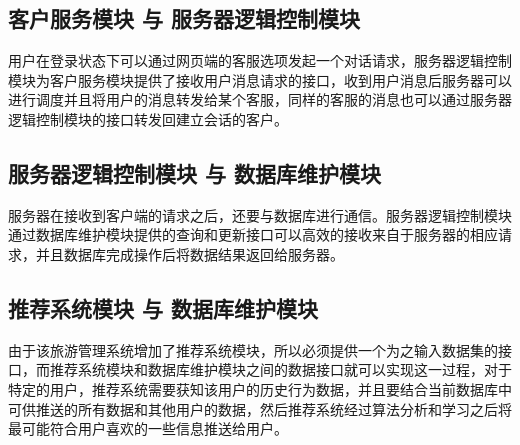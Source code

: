 \subsection{客户服务模块 与 服务器逻辑控制模块}
用户在登录状态下可以通过网页端的客服选项发起一个对话请求，服务器逻辑控制模块为客户服务模块提供了接收用户消息请求的接口，收到用户消息后服务器可以进行调度并且将用户的消息转发给某个客服，同样的客服的消息也可以通过服务器逻辑控制模块的接口转发回建立会话的客户。
\subsection{服务器逻辑控制模块 与 数据库维护模块}
服务器在接收到客户端的请求之后，还要与数据库进行通信。服务器逻辑控制模块通过数据库维护模块提供的查询和更新接口可以高效的接收来自于服务器的相应请求，并且数据库完成操作后将数据结果返回给服务器。
\subsection{推荐系统模块 与 数据库维护模块}
由于该旅游管理系统增加了推荐系统模块，所以必须提供一个为之输入数据集的接口，而推荐系统模块和数据库维护模块之间的数据接口就可以实现这一过程，对于特定的用户，推荐系统需要获知该用户的历史行为数据，并且要结合当前数据库中可供推送的所有数据和其他用户的数据，然后推荐系统经过算法分析和学习之后将最可能符合用户喜欢的一些信息推送给用户。
